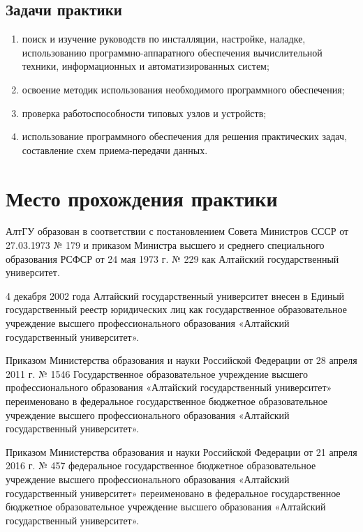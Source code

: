 \documentclass[a4paper, 12pt]{article}
\begin{document}
\subsection*{Задачи практики}
\begin{enumerate}
  \item  поиск и изучение руководств по инсталляции, настройке, наладке, использованию программно-аппаратного обеспечения вычислительной техники, информационных и автоматизированных систем;
  \item  освоение методик использования необходимого программного обеспечения;
  \item  проверка работоспособности типовых узлов и устройств;
  \item  использование программного обеспечения для решения практических задач, составление схем приема-передачи данных.
\end{enumerate}

\newpage

\section{Место прохождения практики}
 
АлтГУ образован в соответствии с постановлением Совета Министров СССР от 27.03.1973 № 179 и приказом Министра высшего и среднего специального образования РСФСР от 24 мая 1973 г. № 229 как Алтайский государственный университет.

4 декабря 2002 года Алтайский государственный университет внесен в Единый государственный реестр юридических лиц как государственное образовательное учреждение высшего профессионального образования «Алтайский государственный университет».

Приказом Министерства образования и науки Российской Федерации от 28 апреля 2011 г. № 1546 Государственное образовательное учреждение высшего профессионального образования «Алтайский государственный университет» переименовано в федеральное государственное бюджетное образовательное учреждение высшего профессионального образования «Алтайский государственный университет».

Приказом Министерства образования и науки Российской Федерации от 21 апреля 2016 г. № 457 федеральное государственное бюджетное образовательное учреждение высшего профессионального образования «Алтайский государственный университет» переименовано в федеральное государственное бюджетное образовательное учреждение высшего образования «Алтайский государственный университет». 
\end{document}
